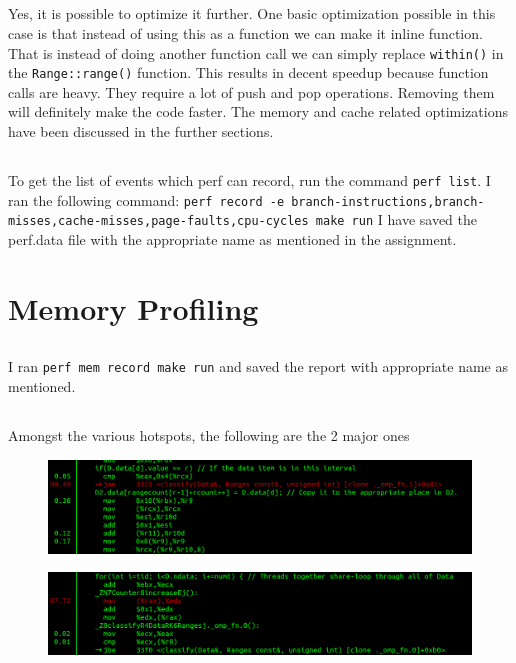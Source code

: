 \documentclass{article}
\begin{document}
\subsection{}
Yes, it is possible to optimize it further. One basic optimization possible in this case is that instead of using this as a function we can make it inline function. That is instead of doing another function call we can simply replace \texttt{within()} in the \texttt{Range::range()} function. This results in decent speedup because function calls are heavy. They require a lot of push and pop operations. Removing them will definitely make the code faster. The memory and cache related optimizations have been discussed in the further sections.

\subsection{}
To get the list of events which perf can record, run the command \texttt{perf list}. I ran the following command: \texttt{perf record -e branch-instructions,branch-misses,cache-misses,page-faults,cpu-cycles make run}
I have saved the perf.data file with the appropriate name as mentioned in the assignment.

\section{Memory Profiling}

\subsection{}
I ran \texttt{perf mem record make run} and saved the report with appropriate name as mentioned.

\subsection{}
Amongst the various hotspots, the following are the 2 major ones
\begin{figure}[H]
\centering
\includegraphics[width=1\textwidth]{images/hot1.png}
\end{figure}
\begin{figure}[H]
\centering
\includegraphics[width=1\textwidth]{images/hot2.png}
\end{figure}
\end{document}
